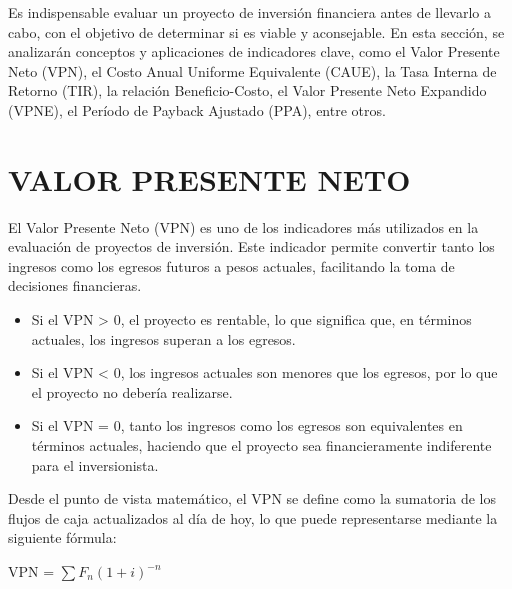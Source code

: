 Es indispensable evaluar un proyecto de inversión financiera antes de llevarlo a cabo, con el objetivo de determinar si es viable y aconsejable. En esta sección, se analizarán conceptos y aplicaciones de indicadores clave, como el Valor Presente Neto (VPN), el Costo Anual Uniforme Equivalente (CAUE), la Tasa Interna de Retorno (TIR), la relación Beneficio-Costo, el Valor Presente Neto Expandido (VPNE), el Período de Payback Ajustado (PPA), entre otros.

\section{VALOR PRESENTE NETO}
El Valor Presente Neto (VPN) es uno de los indicadores más utilizados en la evaluación de proyectos de inversión. Este indicador permite convertir tanto los ingresos como los egresos futuros a pesos actuales, facilitando la toma de decisiones financieras.

\begin{itemize}

\item Si el VPN > 0, el proyecto es rentable, lo que significa que, en términos actuales, los ingresos superan a los egresos.
\item Si el VPN < 0, los ingresos actuales son menores que los egresos, por lo que el proyecto no debería realizarse.
\item Si el VPN = 0, tanto los ingresos como los egresos son equivalentes en términos actuales, haciendo que el proyecto sea  financieramente indiferente para el inversionista.

\end{itemize}

Desde el punto de vista matemático, el VPN se define como la sumatoria de los flujos de caja actualizados al día de hoy, lo que puede representarse mediante la siguiente fórmula:
\begin{center}
	VPN =	$\sum F_{n}(1+i)^{-n}$
\end{center}
